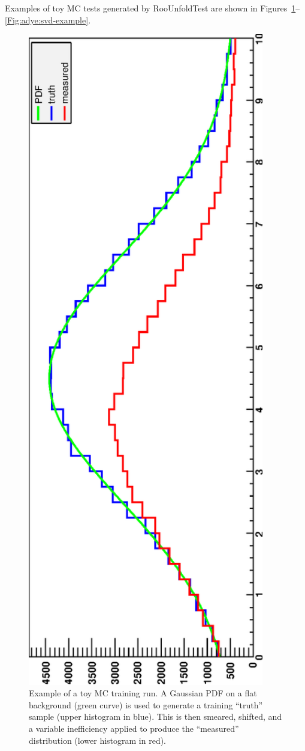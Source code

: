 \documentclass{desyproc}
\begin{document}
Examples of toy MC tests generated by RooUnfoldTest are shown in Figures~\ref{Fig:adye:training-example}--\ref{Fig:adye:svd-example}.

\begin{figure}[ht]
\centerline{\includegraphics[angle=-90,width=0.92\textwidth,clip]{adye_tim.bayes1.eps}}
\caption{Example of a toy MC training run.
A Gaussian PDF on a flat background (green curve) is used to generate
a training ``truth'' sample (upper histogram in blue). This is then smeared, shifted,
and a variable inefficiency applied to produce the ``measured'' distribution
(lower histogram in red).
}\label{Fig:adye:training-example}
\end{figure}%
\end{document}
